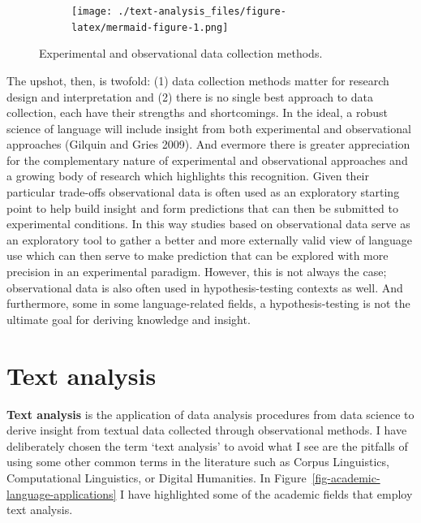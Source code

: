 \documentclass[
  letterpaper,
]{scrbook}
\begin{document}
\begin{figure}

{\centering 

\begin{figure}[H]

{\centering \texttt{[image: ./text-analysis\_files/figure-latex/mermaid-figure-1.png]}

}

\end{figure}

}

\caption{\label{fig-data-colletion-methods}Experimental and
observational data collection methods.}

\end{figure}

The upshot, then, is twofold: (1) data collection methods matter for
research design and interpretation and (2) there is no single best
approach to data collection, each have their strengths and shortcomings.
In the ideal, a robust science of language will include insight from
both experimental and observational approaches (Gilquin and Gries 2009).
And evermore there is greater appreciation for the complementary nature
of experimental and observational approaches and a growing body of
research which highlights this recognition. Given their particular
trade-offs observational data is often used as an exploratory starting
point to help build insight and form predictions that can then be
submitted to experimental conditions. In this way studies based on
observational data serve as an exploratory tool to gather a better and
more externally valid view of language use which can then serve to make
prediction that can be explored with more precision in an experimental
paradigm. However, this is not always the case; observational data is
also often used in hypothesis-testing contexts as well. And furthermore,
some in some language-related fields, a hypothesis-testing is not the
ultimate goal for deriving knowledge and insight.

\hypertarget{text-analysis}{%
\section{Text analysis}\label{text-analysis}}

\textbf{Text analysis} is the application of data analysis procedures
from data science to derive insight from textual data collected through
observational methods. I have deliberately chosen the term `text
analysis' to avoid what I see are the pitfalls of using some other
common terms in the literature such as Corpus Linguistics, Computational
Linguistics, or Digital Humanities. In
Figure~\ref{fig-academic-language-applications} I have highlighted some
of the academic fields that employ text analysis.
\end{document}

